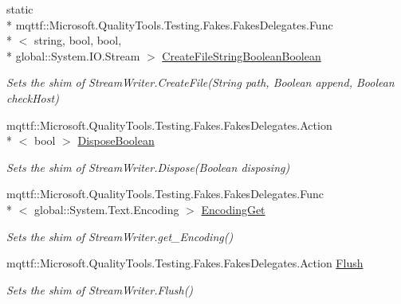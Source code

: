 \begin{DoxyCompactItemize}
static \\*
mqttf\-::\-Microsoft.\-Quality\-Tools.\-Testing.\-Fakes.\-Fakes\-Delegates.\-Func\\*
$<$ string, bool, bool, \\*
global\-::\-System.\-I\-O.\-Stream $>$ \hyperlink{class_system_1_1_i_o_1_1_fakes_1_1_shim_stream_writer_a70a96a8b1a4fbcaaea5199f25b2405dc}{Create\-File\-String\-Boolean\-Boolean}
\begin{DoxyCompactList}\small\item\em Sets the shim of Stream\-Writer.\-Create\-File(\-String path, Boolean append, Boolean check\-Host)\end{DoxyCompactList}\item 
mqttf\-::\-Microsoft.\-Quality\-Tools.\-Testing.\-Fakes.\-Fakes\-Delegates.\-Action\\*
$<$ bool $>$ \hyperlink{class_system_1_1_i_o_1_1_fakes_1_1_shim_stream_writer_a52f99778971b866cc433091f68b93259}{Dispose\-Boolean}
\begin{DoxyCompactList}\small\item\em Sets the shim of Stream\-Writer.\-Dispose(\-Boolean disposing)\end{DoxyCompactList}\item 
mqttf\-::\-Microsoft.\-Quality\-Tools.\-Testing.\-Fakes.\-Fakes\-Delegates.\-Func\\*
$<$ global\-::\-System.\-Text.\-Encoding $>$ \hyperlink{class_system_1_1_i_o_1_1_fakes_1_1_shim_stream_writer_a4a64bdebe282a680b10bd1d600ce4bd2}{Encoding\-Get}
\begin{DoxyCompactList}\small\item\em Sets the shim of Stream\-Writer.\-get\-\_\-\-Encoding()\end{DoxyCompactList}\item 
mqttf\-::\-Microsoft.\-Quality\-Tools.\-Testing.\-Fakes.\-Fakes\-Delegates.\-Action \hyperlink{class_system_1_1_i_o_1_1_fakes_1_1_shim_stream_writer_a044d3646bb63c8853ac06d206168b01b}{Flush}
\begin{DoxyCompactList}\small\item\em Sets the shim of Stream\-Writer.\-Flush()\end{DoxyCompactList}\item 

\end{DoxyCompactItemize}
